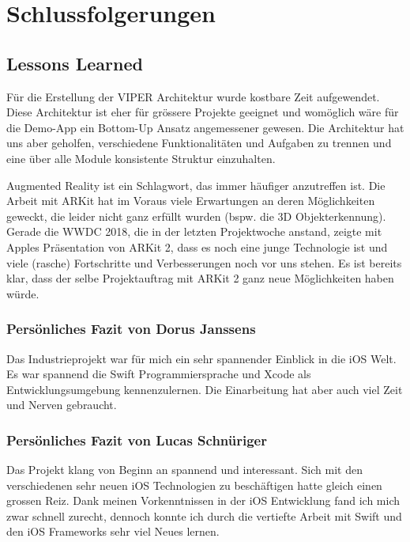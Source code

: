 \section{Schlussfolgerungen}

\subsection{Lessons Learned}

Für die Erstellung der VIPER Architektur wurde kostbare Zeit aufgewendet.
Diese Architektur ist eher für grössere Projekte geeignet und womöglich wäre für die Demo-App ein Bottom-Up Ansatz angemessener gewesen.
Die Architektur hat uns aber geholfen, verschiedene Funktionalitäten und Aufgaben zu trennen und eine über alle Module konsistente Struktur einzuhalten.

Augmented Reality ist ein Schlagwort, das immer häufiger anzutreffen ist.
Die Arbeit mit ARKit hat im Voraus viele Erwartungen an deren Möglichkeiten geweckt, die leider nicht ganz erfüllt wurden (bspw. die 3D Objekterkennung).
Gerade die WWDC 2018, die in der letzten Projektwoche anstand, zeigte mit Apples Präsentation von ARKit 2, dass es noch eine junge Technologie ist und viele (rasche) Fortschritte und Verbesserungen noch vor uns stehen.
Es ist bereits klar, dass der selbe Projektauftrag mit ARKit 2 ganz neue Möglichkeiten haben würde.

\subsubsection{Persönliches Fazit von Dorus Janssens}
Das Industrieprojekt war für mich ein sehr spannender Einblick in die iOS Welt. Es war spannend die Swift Programmiersprache und Xcode als Entwicklungsumgebung kennenzulernen. Die Einarbeitung hat aber auch viel Zeit und Nerven gebraucht. 

\subsubsection{Persönliches Fazit von Lucas Schnüriger}

Das Projekt klang von Beginn an spannend und interessant.
Sich mit den verschiedenen sehr neuen iOS Technologien zu beschäftigen hatte gleich einen grossen Reiz.
Dank meinen Vorkenntnissen in der iOS Entwicklung fand ich mich zwar schnell zurecht, dennoch konnte ich durch die vertiefte Arbeit mit Swift und den iOS Frameworks sehr viel Neues lernen. %

